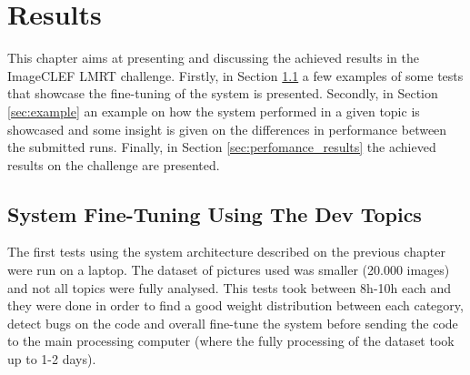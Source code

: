\cleardoublepage
\chapter{Results}
\label{ch:results}

This chapter aims at presenting and discussing the achieved results in the ImageCLEF LMRT challenge. Firstly, in Section \ref{sec:first} a few examples of some tests that showcase the fine-tuning of the system is presented. Secondly, in Section \ref{sec:example} an example on how the system performed in a given topic is showcased and some insight is given on the differences in performance between the submitted runs. Finally, in Section \ref{sec:perfomance_results} the achieved results on the challenge are presented.

\section{System Fine-Tuning Using The Dev Topics}
\label{sec:first}

The first tests using the system architecture described on the previous chapter were run on a laptop. The dataset of pictures used was smaller (20.000 images) and not all topics were fully analysed. This tests took between 8h-10h each and they were done in order to find a good weight distribution between each category, detect bugs on the code and overall fine-tune the system before sending the code to the main processing computer (where the fully processing of the dataset took up to 1-2 days).


